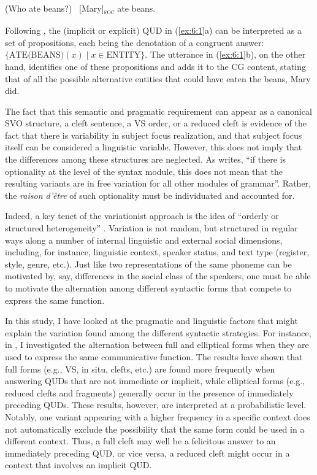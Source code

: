\ea \label{ex:6:1} 
\ea\label{ex:6:1a}  (Who ate beans?)
\ex\label{ex:6:1b}  \ [Mary]\textsubscript{\textsc{foc}} \normalsize ate beans. \hfill \parencite[7]{velleman2016question}
\z \z

Following \textcite{hamblin1976questions}, the (implicit or explicit) QUD in (\ref{ex:6:1}a) can be interpreted as a set of propositions, each being the denotation of a congruent answer: \( \{ \text{ATE(BEANS)}(x) \mid x \in \text{ENTITY} \} \). The utterance in (\ref{ex:6:1}b), on the other hand,  identifies one of these propositions and adds it to the CG content, stating that of all the possible alternative entities that could have eaten the beans, Mary did.

The fact that this semantic and pragmatic requirement can appear as a canonical SVO structure, a cleft sentence, a VS order, or a reduced cleft is evidence of the fact that there is variability in subject focus realization, and that subject focus itself can be considered a linguistic variable. However, this does not imply that the differences among these structures are neglected. As \textcite[198]{adli2006french} writes, ``if there is optionality at the level of the syntax module, this does not mean that the resulting variants are in free variation for all other modules of grammar”. Rather, the \textit{raison d'être} of such optionality must be individuated and accounted for.

Indeed, a key tenet of the variationist approach is the idea of ``orderly or structured heterogeneity” \parencite[99-100]{weinreich1968empirical}. Variation is not random, but structured in regular ways along a number of internal linguistic and external social dimensions, including, for instance, linguistic context, speaker status, and text type (register, style, genre, etc.). 
Just like two representations of the same phoneme can be motivated by, say, differences in the social class of the speakers, one must be able to motivate the alternation among different syntactic forms that compete to express the same function. 

In this study, I have looked at the pragmatic and linguistic factors that might explain the variation found among the different syntactic strategies. For instance, in , I investigated the alternation between full and elliptical forms when they are used to express the same communicative function. The results have shown that full forms (e.g., VS, in situ, clefts, etc.) are found more frequently when answering QUDs that are not immediate or implicit, while elliptical forms (e.g., reduced clefts and fragments) generally occur in the presence of immediately preceding QUDs. These results, however, are interpreted at a probabilistic level. Notably, one variant appearing with a higher frequency in a specific context does not automatically exclude the possibility that the same form could be used in a different context. Thus, a full cleft may well be a felicitous answer to an immediately preceding QUD, or vice versa, a reduced cleft might occur in a context that involves an implicit QUD.


